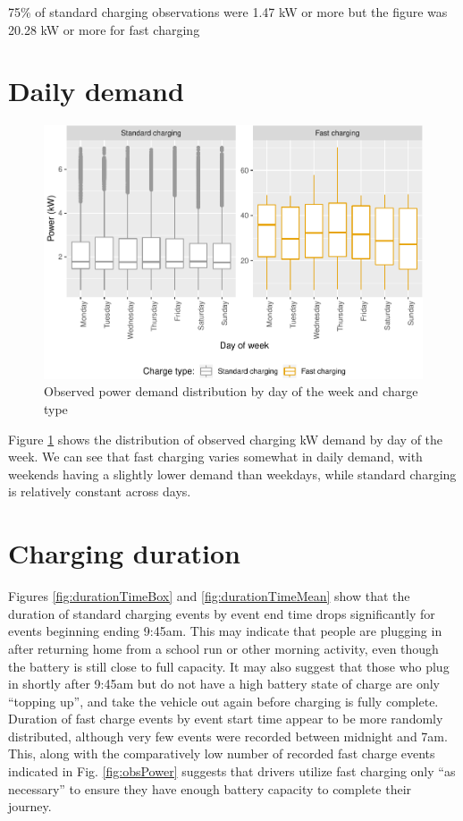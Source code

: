 \documentclass[]{article}
\begin{document}
75\% of standard charging observations were 1.47 kW or more but the
figure was 20.28 kW or more for fast charging

\section{Daily demand}\label{dailyDemand}

\begin{figure}
\centering
\includegraphics{EVBB_report_files/figure-latex/dailyPower-1.pdf}
\caption{\label{fig:dailyPower}Observed power demand distribution by day of
the week and charge type}
\end{figure}

Figure \ref{fig:dailyPower} shows the distribution of observed charging
kW demand by day of the week. We can see that fast charging varies
somewhat in daily demand, with weekends having a slightly lower demand
than weekdays, while standard charging is relatively constant across
days.

\section{Charging duration}\label{duration}

Figures \ref{fig:durationTimeBox} and \ref{fig:durationTimeMean} show
that the duration of standard charging events by event end time drops
significantly for events beginning ending 9:45am. This may indicate that
people are plugging in after returning home from a school run or other
morning activity, even though the battery is still close to full
capacity. It may also suggest that those who plug in shortly after
9:45am but do not have a high battery state of charge are only ``topping
up'', and take the vehicle out again before charging is fully complete.
Duration of fast charge events by event start time appear to be more
randomly distributed, although very few events were recorded between
midnight and 7am. This, along with the comparatively low number of
recorded fast charge events indicated in Fig. \ref{fig:obsPower}
suggests that drivers utilize fast charging only ``as necessary'' to
ensure they have enough battery capacity to complete their journey.
\end{document}
